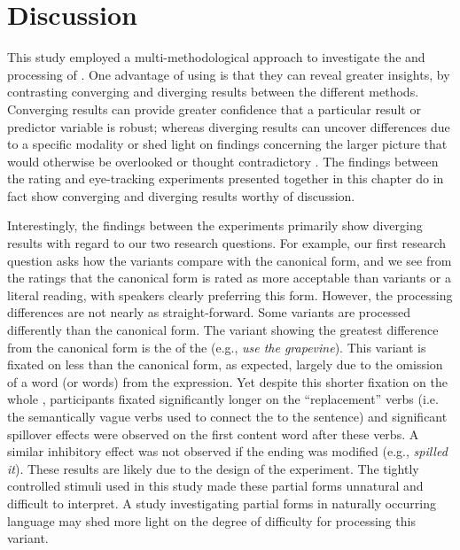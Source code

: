 \documentclass[output=paper
,modfonts
,nonflat]{langsci/langscibook}
\begin{document}




\section{Discussion} 

This study employed a multi-methodological  approach to investigate the  and processing  of . One advantage of using  is that they can reveal greater insights, by contrasting converging and diverging results between the different methods. Converging results can provide greater confidence that a particular result or predictor variable is robust; whereas diverging results can uncover differences due to a specific modality or shed light on findings concerning the larger picture that would otherwise be overlooked or thought contradictory \citep{ArppeJarvikivi2007}. The findings between the  rating  and eye-tracking  experiments presented together in this chapter do in fact show converging and diverging results  worthy of discussion.

Interestingly, the findings between the experiments primarily show diverging results with regard to our two research questions. For example, our first research question asks how the variants compare with the canonical form, and we see from the  ratings that the canonical form is rated as more acceptable than variants or a literal reading, with speakers clearly preferring this form. However, the processing differences are not nearly as straight-forward. Some variants are processed  differently than the canonical form. The variant showing the greatest difference from the canonical form is the  of the  (e.g., \textit{use the grapevine}). This   variant  is fixated on less than the canonical form, as expected, largely due to the omission of a word (or words) from the expression. Yet despite this shorter fixation on the whole , participants fixated significantly longer on the ``replacement'' verbs (i.e. the semantically vague verbs used to connect the  to the sentence) and significant spillover effects were observed on the first content word after these verbs. A similar inhibitory effect was not observed if the ending was modified (e.g., \textit{spilled it}). These results are likely due to the design of the experiment. The tightly controlled stimuli used in this study made these partial forms unnatural and difficult to interpret. A study investigating partial forms in naturally occurring language may shed more light on the degree of difficulty for processing this variant.
\end{document}
